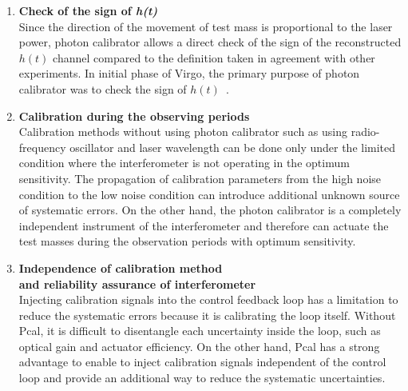 \begin{enumerate}
\item {\bf Check of the sign of \sl h(t)}\\
Since the direction of the movement of test mass is proportional to the 
laser power, photon calibrator allows a direct check of the sign of the 
reconstructed $h(t)$ channel compared to the definition taken in agreement 
with other experiments. In initial phase of Virgo, the primary purpose of 
photon calibrator was to check the sign of $h(t)$~\cite{VIR-018}.

\item {\bf Calibration during the observing periods}\\
Calibration methods without using photon calibrator such as using 
radio-frequency oscillator and laser wavelength can be done only under the 
limited condition where the interferometer is not operating in the optimum 
sensitivity. The propagation of calibration parameters from the high noise 
condition to the low noise condition can introduce additional unknown source 
of systematic errors. On the other hand, the photon calibrator is a completely 
independent instrument of the interferometer and therefore can actuate 
the test masses during the observation periods with optimum sensitivity. 


\item {\bf Independence of calibration method\\
      and reliability assurance of interferometer}\\
Injecting calibration signals into the control feedback loop has a limitation 
to reduce the systematic errors because it is calibrating the loop itself.
Without Pcal, it is difficult to disentangle each uncertainty inside the loop, 
such as optical gain and actuator efficiency. On the other hand, Pcal has a 
strong advantage to enable to inject calibration signals independent of the 
control loop and provide an additional way to reduce the systematic 
uncertainties.


\end{enumerate}
